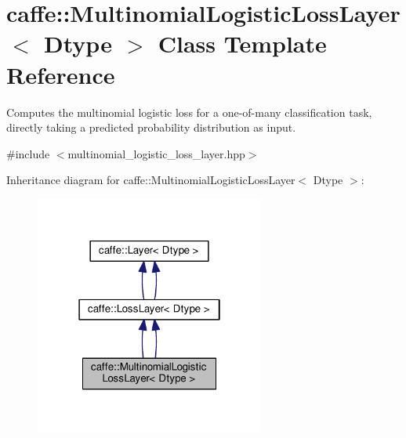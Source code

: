 \hypertarget{classcaffe_1_1_multinomial_logistic_loss_layer}{}\section{caffe\+:\+:Multinomial\+Logistic\+Loss\+Layer$<$ Dtype $>$ Class Template Reference}
\label{classcaffe_1_1_multinomial_logistic_loss_layer}


Computes the multinomial logistic loss for a one-\/of-\/many classification task, directly taking a predicted probability distribution as input.  




{\ttfamily \#include $<$multinomial\+\_\+logistic\+\_\+loss\+\_\+layer.\+hpp$>$}



Inheritance diagram for caffe\+:\+:Multinomial\+Logistic\+Loss\+Layer$<$ Dtype $>$\+:
\nopagebreak
\begin{figure}[H]
\begin{center}
\leavevmode
\includegraphics[width=214pt]{classcaffe_1_1_multinomial_logistic_loss_layer__inherit__graph}
\end{center}
\end{figure}
